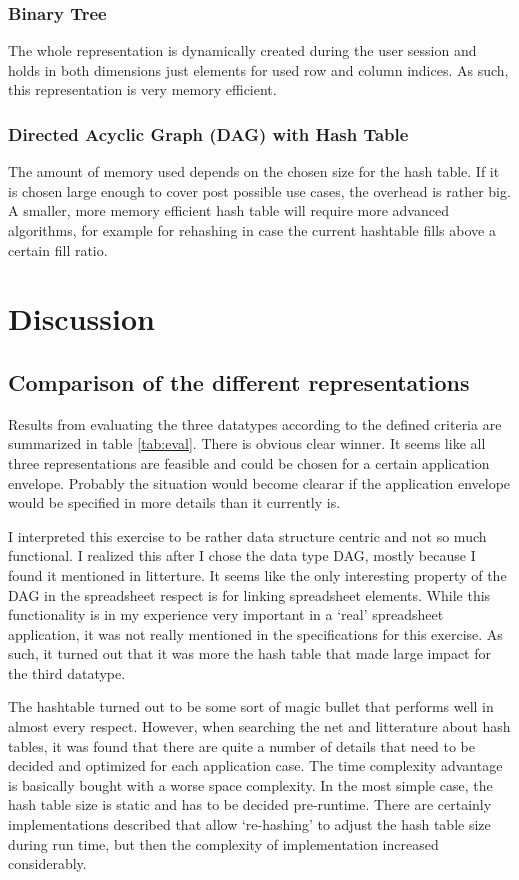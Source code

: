 \documentclass[a4paper,11pt,twoside]{article}
\begin{document}
\subsubsection{Binary Tree}
The whole representation is dynamically created during the user
session and holds in both dimensions just elements for used row and
column indices. As such, this representation is very memory efficient.


\subsubsection{Directed Acyclic Graph (DAG) with Hash Table}
The amount of memory used depends on the chosen size for the hash
table. If it is chosen large enough to cover post possible use cases,
the overhead is rather big. A smaller, more memory efficient hash
table will require more advanced algorithms, for example for rehashing
in case the current hashtable fills above a certain fill ratio. 


\section{Discussion}
\subsection{Comparison of the different representations}
Results from evaluating the three datatypes according to the defined
criteria are summarized in table \ref{tab:eval}. There is obvious
clear winner. It seems like all three representations are feasible and
could be chosen for a certain application envelope. Probably the
situation would become clearar if the application envelope would be
specified in more details than it currently is.

I interpreted this exercise to be rather data structure centric and
not so much functional. I realized this after I chose the data type
DAG, mostly because I found it mentioned in litterture. It seems like
the only interesting property of the DAG in the spreadsheet respect is
for linking spreadsheet elements. While this functionality is in my
experience very important in a `real' spreadsheet application, it was
not really mentioned in the specifications for this exercise. As such,
it turned out that it was more the hash table that made large impact
for the third datatype.

The hashtable turned out to be some sort of magic bullet that performs
well in almost every respect. However, when searching the net
and litterature about hash tables, it was found that there are quite a
number of details that need to be decided and optimized for each
application case. The time complexity advantage is basically bought
with a worse space complexity. In the most simple case, the hash table
size is static and has to be decided pre-runtime. There are certainly
implementations described that allow `re-hashing' to adjust the hash
table size during run time, but then the complexity of implementation
increased considerably.
\end{document}
